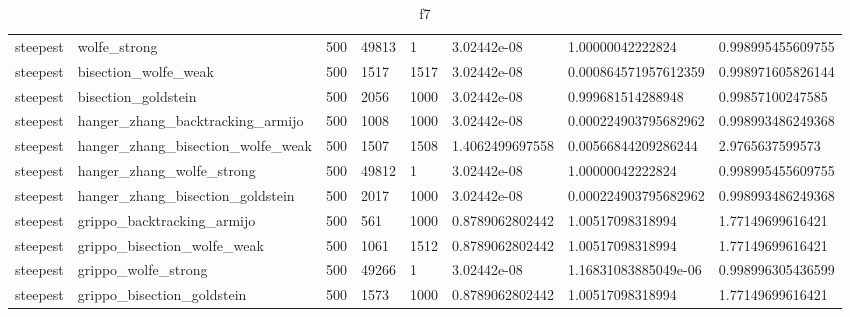 \documentclass[a4paper,11pt]{article}
\numberwithin{equation}{section} %
\begin{document}
\begin{table}[h!]
{\begin{tabular}{|l|l|l|l|l|l|l|l|}
        steepest & wolfe\_strong & 500 & 49813 & 1 & 3.02442e-08 & 1.00000042222824 & 0.998995455609755 \\
        steepest & bisection\_wolfe\_weak & 500 & 1517 & 1517 & 3.02442e-08 & 0.000864571957612359 & 0.998971605826144 \\
        steepest & bisection\_goldstein & 500 & 2056 & 1000 & 3.02442e-08 & 0.999681514288948 & 0.99857100247585 \\
        steepest & hanger\_zhang\_backtracking\_armijo & 500 & 1008 & 1000 & 3.02442e-08 & 0.000224903795682962 & 0.998993486249368 \\
        steepest & hanger\_zhang\_bisection\_wolfe\_weak & 500 & 1507 & 1508 & 1.4062499697558 & 0.00566844209286244 & 2.9765637599573 \\
        steepest & hanger\_zhang\_wolfe\_strong & 500 & 49812 & 1 & 3.02442e-08 & 1.00000042222824 & 0.998995455609755 \\
        steepest & hanger\_zhang\_bisection\_goldstein & 500 & 2017 & 1000 & 3.02442e-08 & 0.000224903795682962 & 0.998993486249368 \\
        steepest & grippo\_backtracking\_armijo & 500 & 561 & 1000 & 0.8789062802442 & 1.00517098318994 & 1.77149699616421 \\
        steepest & grippo\_bisection\_wolfe\_weak & 500 & 1061 & 1512 & 0.8789062802442 & 1.00517098318994 & 1.77149699616421 \\
        steepest & grippo\_wolfe\_strong & 500 & 49266 & 1 & 3.02442e-08 & 1.16831083885049e-06 & 0.998996305436599 \\
        steepest & grippo\_bisection\_goldstein & 500 & 1573 & 1000 & 0.8789062802442 & 1.00517098318994 & 1.77149699616421 \\

\end{tabular}}
\caption{f7}
\label{table:f7}
\end{table}
\end{document}
